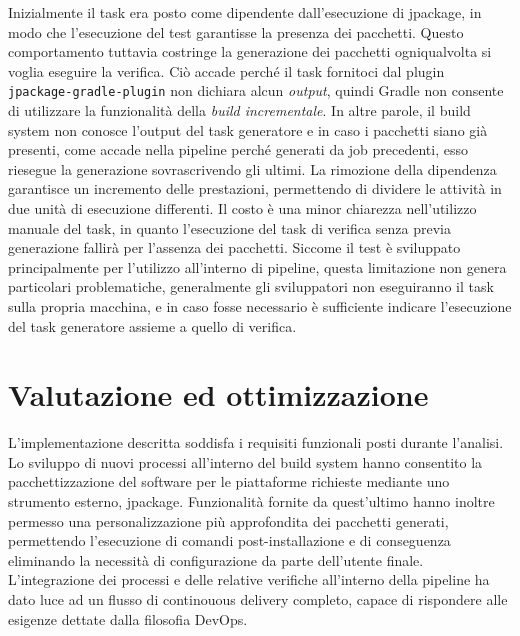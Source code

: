 Inizialmente il task era posto come dipendente dall'esecuzione di jpackage, in modo che l'esecuzione del test garantisse la presenza dei pacchetti. Questo comportamento tuttavia costringe la generazione dei pacchetti ogniqualvolta si voglia eseguire la verifica. Ciò accade perché il task fornitoci dal plugin \texttt{jpackage-gradle-plugin} non dichiara alcun \textit{output}, quindi Gradle non consente di utilizzare la funzionalità della \textit{build incrementale}. In altre parole, il build system non conosce l'output del task generatore e in caso i pacchetti siano già presenti, come accade nella pipeline perché generati da job precedenti, esso riesegue la generazione sovrascrivendo gli ultimi. La rimozione della dipendenza garantisce un incremento delle prestazioni, permettendo di dividere le attività in due unità di esecuzione differenti. Il costo è una minor chiarezza nell'utilizzo manuale del task, in quanto l'esecuzione del task di verifica senza previa generazione fallirà per l'assenza dei pacchetti. Siccome il test è sviluppato principalmente per l'utilizzo all'interno di pipeline, questa limitazione non genera particolari problematiche, generalmente gli sviluppatori non eseguiranno il task sulla propria macchina, e in caso fosse necessario è sufficiente indicare l'esecuzione del task generatore assieme a quello di verifica.

\section{Valutazione ed ottimizzazione}
L'implementazione descritta soddisfa i requisiti funzionali posti durante l'analisi. Lo sviluppo di nuovi processi all'interno del build system hanno consentito la pacchettizzazione del software per le piattaforme richieste mediante uno strumento esterno, jpackage. Funzionalità fornite da quest'ultimo hanno inoltre permesso una personalizzazione più approfondita dei pacchetti generati, permettendo l'esecuzione di comandi post-installazione e di conseguenza eliminando la necessità di configurazione da parte dell'utente finale. L'integrazione dei processi e delle relative verifiche all'interno della pipeline ha dato luce ad un flusso di continouous delivery completo, capace di rispondere alle esigenze dettate dalla filosofia DevOps.


